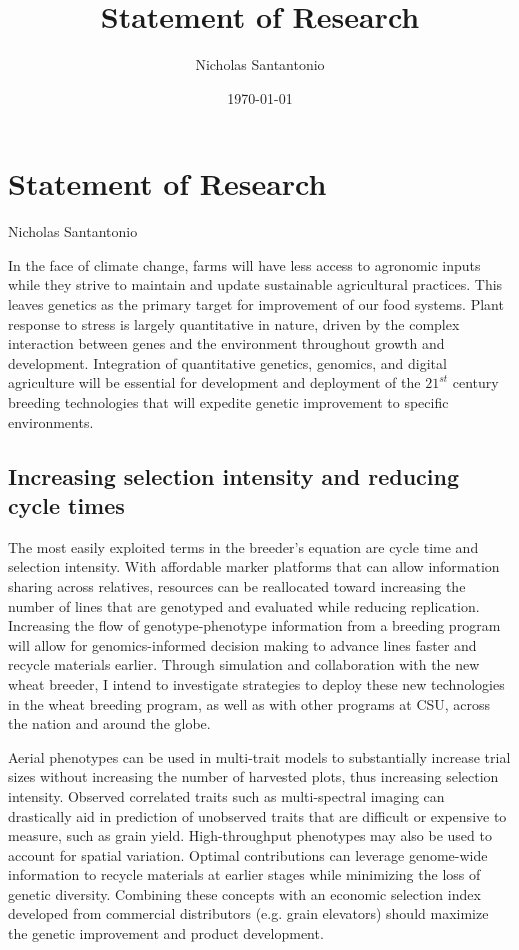 \documentclass[11pt]{article}
\title{Statement of Research}
\author{Nicholas Santantonio}
\date{\today}
\begin{document}
\section*{\centering Statement of Research}
\begin{center} Nicholas Santantonio \end{center}

\noindent In the face of climate change, farms will have less access to agronomic inputs while they strive to maintain and update sustainable agricultural practices. This leaves genetics as the primary target for improvement of our food systems. Plant response to stress is largely quantitative in nature, driven by the complex interaction between genes and the environment throughout growth and development. Integration of quantitative genetics, genomics, and digital agriculture will be essential for development and deployment of the $21^{st}$ century breeding technologies that will expedite genetic improvement to specific environments.

\subsection*{Increasing selection intensity and reducing cycle times}

The most easily exploited terms in the breeder's equation are cycle time and selection intensity. With affordable marker platforms that can allow information sharing across relatives, resources can be reallocated toward increasing the number of lines that are genotyped and evaluated while reducing replication. Increasing the flow of genotype-phenotype information from a breeding program will allow for genomics-informed decision making to advance lines faster and recycle materials earlier. Through simulation and collaboration with the new wheat breeder, I intend to investigate strategies to deploy these new technologies in the wheat breeding program, as well as with other programs at CSU, across the nation and around the globe. 

Aerial phenotypes can be used in multi-trait models to substantially increase trial sizes without increasing the number of harvested plots, thus increasing selection intensity. Observed correlated traits such as multi-spectral imaging can drastically aid in prediction of unobserved traits that are difficult or expensive to measure, such as grain yield. High-throughput phenotypes may also be used to account for spatial variation. Optimal contributions can leverage genome-wide information to recycle materials at earlier stages while minimizing the loss of genetic diversity. Combining these concepts with an economic selection index developed from commercial distributors (e.g. grain elevators) should maximize the genetic improvement and product development. 
\end{document}
